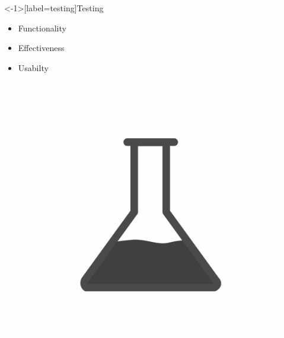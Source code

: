 \documentclass[aspectratio=169]{beamer}
[aspectratio=169] %
\begin{document}
\begin{frame}<-1>[label=testing]{Testing}
  \begin{minipage}{0.49\textwidth} 
    \begin{itemize}
      \item<1-> Functionality
      \item<2-> Effectiveness
      \item<3-> Usabilty
    \end{itemize}
  \end{minipage}
  \hfill
  \begin{minipage}{0.49\textwidth} 
    \begin{figure}
      \centering
      \includegraphics[height=0.5\textheight]{figures/test-tube.png}
    \end{figure}
  \end{minipage}
\end{frame}
\end{document}
